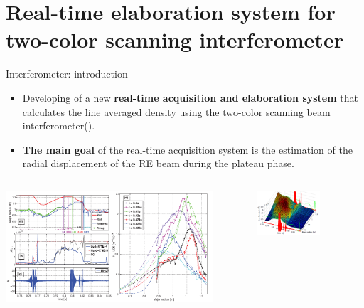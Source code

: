\documentclass{beamer}
\begin{document}
\section{Real-time elaboration system for two-color scanning interferometer}
\begin{frame}{Interferometer: introduction}
\scriptsize	
\begin{itemize}
\item Developing of a new \textbf{real-time acquisition and elaboration system} that calculates the line averaged density using the two-color scanning beam interferometer(\cite{doi:10.13182/FST04-A522}).
\item \textbf{The main goal} of the real-time acquisition system is the estimation of the radial displacement of the RE beam during the plateau phase.
\end{itemize}

\begin{columns}
	\begin{column}{0.5\textwidth}
                \centering
                \includegraphics[width=1\linewidth]{inter/density_profile_35965_}	\end{column}
	\begin{column}{0.5\textwidth}  %
	
        \begin{figure}
        	\centering
        	\includegraphics[width=0.8\textwidth]{inter/inter_35965.png}
        \end{figure}
    \scriptsize	


\end{column}
\end{columns}
\end{frame}
\end{document}
